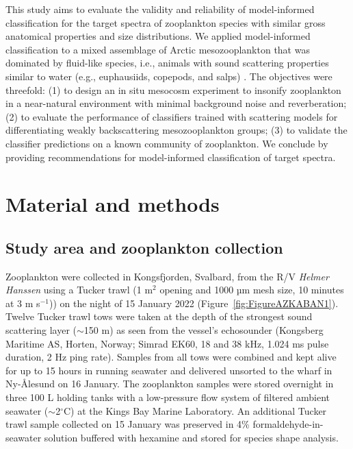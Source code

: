 This study aims to evaluate the validity and reliability of model-informed classification for the target spectra of zooplankton species with similar gross anatomical properties and size distributions. We applied model-informed classification to a mixed assemblage of Arctic mesozooplankton that was dominated by fluid-like species, i.e., animals with sound scattering properties similar to water (e.g., euphausiids, copepods, and salps) \citep{Stanton2000b}. The objectives were threefold: (1) to design an in situ mesocosm experiment to insonify zooplankton in a near-natural environment with minimal background noise and reverberation; (2) to evaluate the performance of classifiers trained with scattering models for differentiating weakly backscattering mesozooplankton groups; (3) to validate the classifier predictions on a known community of zooplankton. We conclude by providing recommendations for model-informed classification of target spectra.

\section{Material and methods}
\subsection{Study area and zooplankton collection}
Zooplankton were collected in Kongsfjorden, Svalbard, from the R/V \textit{Helmer Hanssen} using a Tucker trawl (1 m$^2$ opening and 1000 µm mesh size, 10 minutes at 3 m s$^{-1}$)) on the night of 15 January 2022 (Figure~\ref{fig:FigureAZKABAN1}). Twelve Tucker trawl tows were taken at the depth of the strongest sound scattering layer ($\sim$150 m) as seen from the vessel's echosounder (Kongsberg Maritime AS, Horten, Norway; Simrad EK60, 18 and 38 kHz, 1.024 ms pulse duration, 2 Hz ping rate). Samples from all tows were combined and kept alive for up to 15 hours in running seawater and delivered unsorted to the wharf in Ny-Ålesund on 16 January. The zooplankton samples were stored overnight in three 100 L holding tanks with a low-pressure flow system of filtered ambient seawater ($\sim$2$^{\circ}$C) at the Kings Bay Marine Laboratory. An additional Tucker trawl sample collected on 15 January was preserved in 4\% formaldehyde-in-seawater solution buffered with hexamine and stored for species shape analysis.\\



